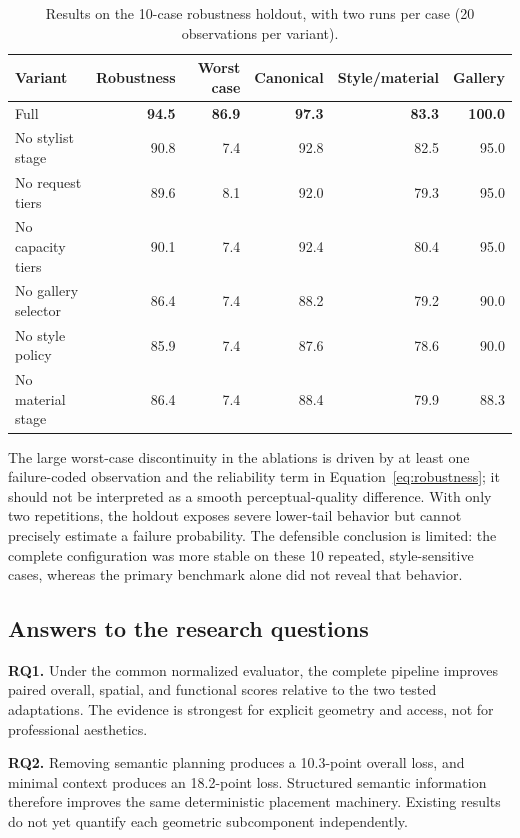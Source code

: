 \documentclass[pdflatex,sn-mathphys-num]{sn-jnl}
\begin{document}
\begin{table}[!t]
  \caption{Results on the 10-case robustness holdout, with two runs per case (20 observations per variant).}\label{tab:robustness}
  \centering
  \scriptsize
  \setlength{\tabcolsep}{3.5pt}
  \begin{tabular}{@{}lrrrrr@{}}
    \toprule
    Variant & Robustness & Worst case & Canonical & Style/material & Gallery \\
    \midrule
    Full & \textbf{94.5} & \textbf{86.9} & \textbf{97.3} & \textbf{83.3} & \textbf{100.0} \\
    No stylist stage & 90.8 & 7.4 & 92.8 & 82.5 & 95.0 \\
    No request tiers & 89.6 & 8.1 & 92.0 & 79.3 & 95.0 \\
    No capacity tiers & 90.1 & 7.4 & 92.4 & 80.4 & 95.0 \\
    No gallery selector & 86.4 & 7.4 & 88.2 & 79.2 & 90.0 \\
    No style policy & 85.9 & 7.4 & 87.6 & 78.6 & 90.0 \\
    No material stage & 86.4 & 7.4 & 88.4 & 79.9 & 88.3 \\
    \bottomrule
  \end{tabular}
\end{table}

The large worst-case discontinuity in the ablations is driven by at least one failure-coded observation and the reliability term in Equation~\eqref{eq:robustness}; it should not be interpreted as a smooth perceptual-quality difference. With only two repetitions, the holdout exposes severe lower-tail behavior but cannot precisely estimate a failure probability. The defensible conclusion is limited: the complete configuration was more stable on these 10 repeated, style-sensitive cases, whereas the primary benchmark alone did not reveal that behavior.

\subsection{Answers to the research questions}

\textbf{RQ1.} Under the common normalized evaluator, the complete pipeline improves paired overall, spatial, and functional scores relative to the two tested adaptations. The evidence is strongest for explicit geometry and access, not for professional aesthetics.

\textbf{RQ2.} Removing semantic planning produces a 10.3-point overall loss, and minimal context produces an 18.2-point loss. Structured semantic information therefore improves the same deterministic placement machinery. Existing results do not yet quantify each geometric subcomponent independently.
\end{document}
